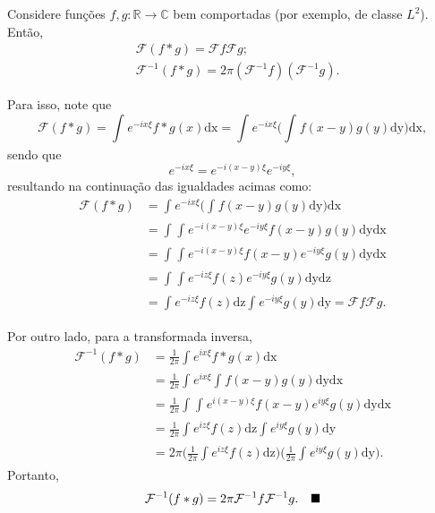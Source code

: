 \documentclass[../pde_notes.tex]{subfiles}
\begin{document}
\begin{prop*}
	Considere funções \(f, g:\mathbb{R}\rightarrow \mathbb{C}\) bem comportadas (por exemplo, de classe \(L^{2}\)). Então,
	\begin{align*}
		 & \mathcal{F}(f*g) = \mathcal{F}f \mathcal{F}g;                        \\
		 & \mathcal{F}^{-1}(f*g) = 2\pi (\mathcal{F}^{-1}f)(\mathcal{F}^{-1}g).
	\end{align*}
\end{prop*}
\begin{proof*}
	Para isso, note que
	\[
		\mathcal{F}(f*g) = \int_{}^{}e^{-ix\xi }f*g(x) \mathrm{dx} = \int_{}^{}e^{-ix\xi }\biggl(\int_{}^{}f(x-y)g(y) \mathrm{dy}\biggr) \mathrm{dx},
	\]
	sendo que
	\[
		e^{-ix\xi } = e^{-i(x-y)\xi }e^{-iy\xi },
	\]
	resultando na continuação das igualdades acimas como:
	\begin{align*}
		\mathcal{F}(f*g) & =\int_{}^{}e^{-ix\xi }\biggl(\int_{}^{}f(x-y)g(y) \mathrm{dy}\biggr) \mathrm{dx}                        \\
		                 & =\int_{}^{}\int_{}^{}e^{-i(x-y)\xi }e^{-iy\xi }f(x-y)g(y) \mathrm{dy} \mathrm{dx}                       \\
		                 & =\int_{}^{}\int_{}^{}e^{-i(x-y)\xi }f(x-y)e^{-iy\xi }g(y) \mathrm{dy} \mathrm{dx}                       \\
		                 & =\int_{}^{}\int_{}^{}e^{-iz\xi }f(z)e^{-iy\xi }g(y) \mathrm{dy} \mathrm{dz}                             \\
		                 & =\int_{}^{}e^{-iz\xi }f(z) \mathrm{dz}\int_{}^{}e^{-iy\xi }g(y) \mathrm{dy}= \mathcal{F}f \mathcal{F}g.
	\end{align*}

	Por outro lado, para a transformada inversa,
	\begin{align*}
		\mathcal{F}^{-1}(f*g) & = \frac{1}{2\pi }\int_{}^{}e^{ix\xi }f*g(x) \mathrm{dx}                                                                                    \\
		                      & = \frac{1}{2\pi }\int_{}^{}e^{ix\xi }\int_{}^{}f(x-y)g(y) \mathrm{dy}\mathrm{dx}                                                           \\
		                      & = \frac{1}{2\pi }\int_{}^{} \int_{}^{}e^{i(x-y)\xi }f(x-y)e^{iy\xi }g(y) \mathrm{dy}\mathrm{dx}                                            \\
		                      & = \frac{1}{2\pi }\int_{}^{}e^{iz\xi }f(z) \mathrm{dz}\int_{}^{}e^{iy\xi }g(y) \mathrm{dy}                                                  \\
		                      & = 2\pi \biggl(\frac{1}{2\pi }\int_{}^{}e^{iz\xi }f(z) \mathrm{dz}\biggr)\biggl(\frac{1}{2\pi }\int_{}^{}e^{iy\xi }g(y) \mathrm{dy}\biggr).
	\end{align*}
	Portanto,
	\[
		\mathcal{F}^{-1}(f*g) = 2\pi \mathcal{F}^{-1}f \mathcal{F}^{-1}g.\quad \text{$\blacksquare$}
	\]
\end{proof*}
\end{document}
